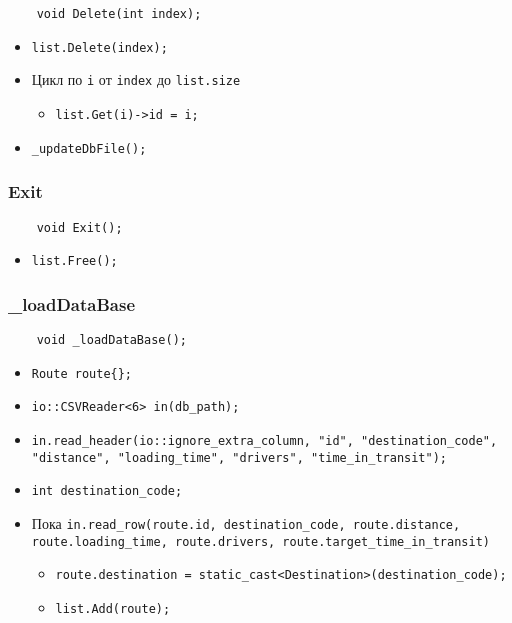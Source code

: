 \begin{lstlisting}
    void Delete(int index);
\end{lstlisting}

\begin{itemize}
    \item \verb|list.Delete(index);|
    \item Цикл по \verb|i| от \verb|index| до \verb|list.size| 
    \begin{itemize}
        \item \verb|list.Get(i)->id = i;|
    \end{itemize}
    \item \verb|_updateDbFile();|
\end{itemize}

\subsubsection{Exit}

\begin{lstlisting}
    void Exit();
\end{lstlisting}

\begin{itemize}
    \item \verb|list.Free();|
\end{itemize}

\subsubsection{\_loadDataBase}

\begin{lstlisting}
    void _loadDataBase();
\end{lstlisting}

\begin{itemize}
    \item \verb|Route route{};|
    \item \verb|io::CSVReader<6> in(db_path);|
    \item \verb|in.read_header(io::ignore_extra_column, "id", "destination_code",|
    \verb|"distance", "loading_time", "drivers", "time_in_transit");|
    \item \verb|int destination_code;|
    \item Пока \verb|in.read_row(route.id, destination_code, route.distance,|
               \verb|route.loading_time, route.drivers, route.target_time_in_transit)|
        \begin{itemize}
            \item \verb|route.destination = static_cast<Destination>(destination_code);|
            \item \verb|list.Add(route);|
        \end{itemize}
\end{itemize}

